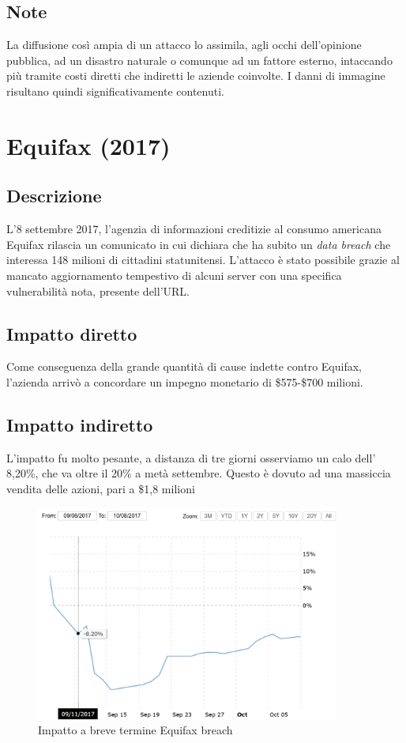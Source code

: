 \documentclass[12pt,a4paper,openright,twoside]{report}
\begin{document}
\subsection{Note}

La diffusione cos\`i ampia di un attacco lo assimila, agli occhi dell'opinione pubblica, ad un disastro naturale o comunque ad un fattore esterno, intaccando pi\`u tramite costi diretti che indiretti le aziende coinvolte. I danni di immagine risultano quindi significativamente contenuti.

\section{Equifax (2017)}
\subsection{Descrizione}
L'8 settembre 2017, l'agenzia di informazioni creditizie al consumo americana Equifax rilascia un comunicato in cui dichiara che ha subito un \textit{data breach} che interessa  148 milioni di cittadini statunitensi. L'attacco \`e stato possibile grazie al mancato aggiornamento tempestivo di alcuni server con una specifica vulnerabilit\`a nota, presente dell'URL\cite{Equifax_case_study_2}.\\
\subsection{Impatto diretto}
Come conseguenza della grande quantit\`a di cause indette contro Equifax, l'azienda arriv\`o a concordare un impegno monetario di \$575-\$700 milioni\cite{Equifax_settlement}.\\
\subsection{Impatto indiretto}
L'impatto fu molto pesante, a distanza di tre giorni osserviamo un calo dell' 8,20\%, che va oltre il 20\% a met\`a settembre. Questo \`e dovuto ad una massiccia vendita delle azioni, pari a \$1,8 milioni\cite{Uber_plusEquifaxAndYahoo}\\

\begin{figure}[H] 
\begin{center} 
\includegraphics[width=10cm]{figures/equifax_short.png} 
\caption[Grafico Equifax short]{Impatto a breve termine Equifax breach}\label{fig:eqx1}
\end{center}
\end{figure}
\end{document}

